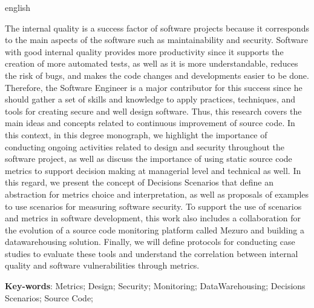 \begin{resumo}[Abstract]
  \begin{otherlanguage*}{english} 
  
The internal quality is a success factor of software projects because it corresponds to the main aspects of the software such as maintainability and security. Software with good internal quality provides more productivity since it supports the creation of more automated tests, as well as it is more understandable, reduces the risk of bugs, and makes the code changes and developments easier to be done. Therefore, the Software Engineer is a major contributor for this success since he should gather a set of skills and knowledge to apply practices, techniques, and tools for creating secure and well design software. Thus, this research covers the main ideas and concepts related to continuous improvement of source code. In this context, in this degree monograph, we highlight the importance of conducting ongoing activities related to design and security throughout the software project, as well as discuss the importance of using static source code metrics to support decision making at managerial level and technical as well. In this regard, we present the concept of Decisions Scenarios that define an abstraction for metrics choice and interpretation, as well as proposals of examples to use scenarios for measuring software security. To support the use of scenarios and metrics in software development, this work also includes a collaboration for the evolution of a source code monitoring platform called Mezuro and building a datawarehousing solution. Finally, we will define protocols for conducting case studies to evaluate these tools and understand the correlation between internal quality and software vulnerabilities through metrics.
  
  \vspace{\onelineskip}
 
  \noindent 
  \textbf{Key-words}: Metrics; Design; Security; Monitoring; DataWarehousing; Decisions Scenarios; Source Code;
  \end{otherlanguage*}
\end{resumo}


